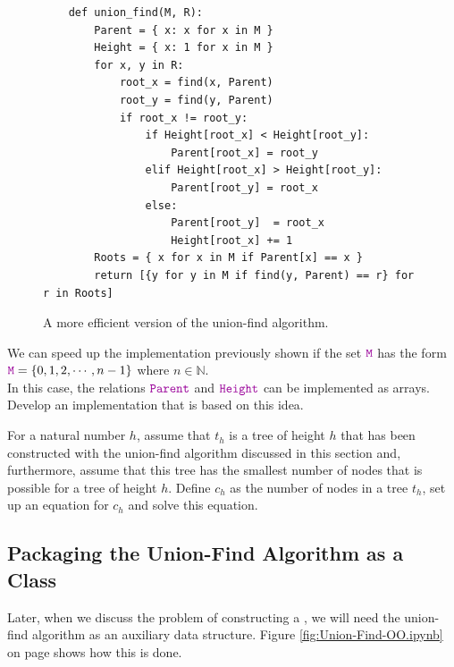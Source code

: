 \begin{figure}[!ht]
\centering
\begin{verbatim}
    def union_find(M, R):
        Parent = { x: x for x in M } 
        Height = { x: 1 for x in M }
        for x, y in R:
            root_x = find(x, Parent)
            root_y = find(y, Parent)
            if root_x != root_y:
                if Height[root_x] < Height[root_y]:
                    Parent[root_x] = root_y
                elif Height[root_x] > Height[root_y]:
                    Parent[root_y] = root_x
                else:
                    Parent[root_y]  = root_x
                    Height[root_x] += 1
        Roots = { x for x in M if Parent[x] == x }
        return [{y for y in M if find(y, Parent) == r} for r in Roots]
\end{verbatim}
\vspace*{-0.3cm}
\caption{A more efficient version of the union-find algorithm.}
\label{fig:Union-Find.ipynb}
\end{figure}

\exercise
We can speed up the implementation previously shown if the set $\mytt{M}$ has the form
\\[0.2cm]
\hspace*{1.3cm}
$\mytt{M} = \{ 0, 1, 2, \cdots, n-1 \}$ \quad where $n \in \mathbb{N}$.
\\[0.2cm]
In this case, the relations $\mytt{Parent}$ and $\mytt{Height}$ can be implemented as arrays.
Develop an implementation that is based on this idea.
\eox

\exercise
For a natural number $h$, assume that $t_h$ is a tree of height $h$ that has been constructed with the union-find algorithm
discussed in this section and, furthermore, assume that this tree has the smallest number of nodes that is
possible for a tree of height $h$.  Define $c_h$ as the number of nodes in a tree $t_h$, set up an equation for
$c_h$ and solve this equation. \eox


\subsection{Packaging the  Union-Find Algorithm as a Class \label{sec:union-find-oo}}
Later, when we discuss the problem of constructing a , we will need the union-find
algorithm as an auxiliary data structure.  Figure \ref{fig:Union-Find-OO.ipynb} on page
\pageref{fig:Union-Find-OO.ipynb} shows how this is done.

